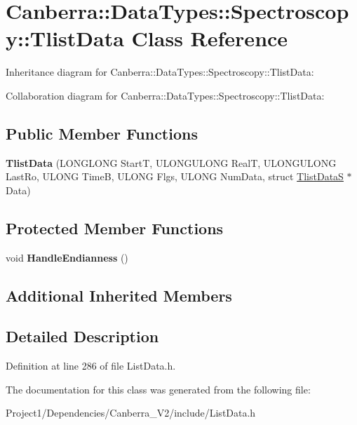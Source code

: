 \hypertarget{class_canberra_1_1_data_types_1_1_spectroscopy_1_1_tlist_data}{}\section{Canberra\+:\+:Data\+Types\+:\+:Spectroscopy\+:\+:Tlist\+Data Class Reference}
\label{class_canberra_1_1_data_types_1_1_spectroscopy_1_1_tlist_data}


Inheritance diagram for Canberra\+:\+:Data\+Types\+:\+:Spectroscopy\+:\+:Tlist\+Data\+:


Collaboration diagram for Canberra\+:\+:Data\+Types\+:\+:Spectroscopy\+:\+:Tlist\+Data\+:
\subsection*{Public Member Functions}
\begin{DoxyCompactItemize}
\item 
\mbox{\label{class_canberra_1_1_data_types_1_1_spectroscopy_1_1_tlist_data_a49a5e45f78507f3c18869f76aa8d2770}} 
{\bfseries Tlist\+Data} (L\+O\+N\+G\+L\+O\+NG StartT, U\+L\+O\+N\+G\+U\+L\+O\+NG RealT, U\+L\+O\+N\+G\+U\+L\+O\+NG Last\+Ro, U\+L\+O\+NG TimeB, U\+L\+O\+NG Flgs, U\+L\+O\+NG Num\+Data, struct \hyperlink{struct_canberra_1_1_data_types_1_1_spectroscopy_1_1_tlist_data_s}{Tlist\+DataS} $\ast$Data)
\end{DoxyCompactItemize}
\subsection*{Protected Member Functions}
\begin{DoxyCompactItemize}
\item 
\mbox{\label{class_canberra_1_1_data_types_1_1_spectroscopy_1_1_tlist_data_afffa3cc5eec3140a9f6320aa32d8a55f}} 
void {\bfseries Handle\+Endianness} ()
\end{DoxyCompactItemize}
\subsection*{Additional Inherited Members}


\subsection{Detailed Description}


Definition at line 286 of file List\+Data.\+h.



The documentation for this class was generated from the following file\+:\begin{DoxyCompactItemize}
\item 
Project1/\+Dependencies/\+Canberra\+\_\+\+V2/include/List\+Data.\+h\end{DoxyCompactItemize}
